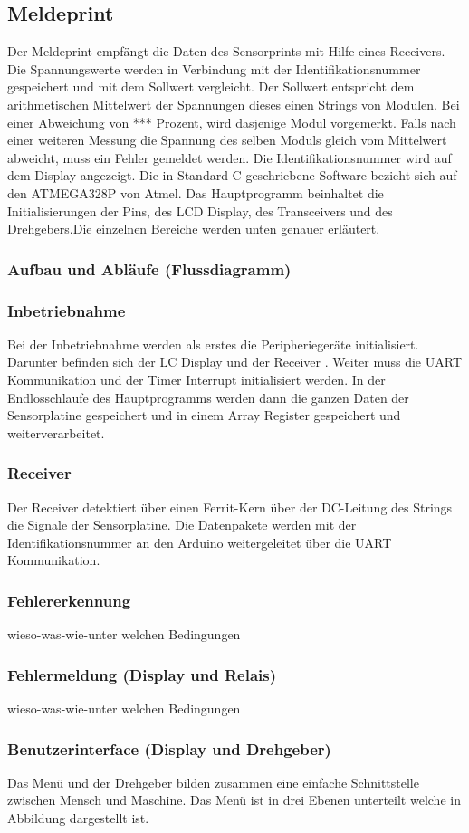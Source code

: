 \subsection{Meldeprint}
Der Meldeprint empfängt die Daten des Sensorprints mit Hilfe eines Receivers. Die Spannungswerte werden in Verbindung mit der Identifikationsnummer gespeichert und mit dem Sollwert vergleicht. Der Sollwert entspricht dem arithmetischen Mittelwert der Spannungen dieses einen Strings von Modulen. Bei einer Abweichung von *** Prozent, wird dasjenige Modul vorgemerkt. Falls nach einer weiteren Messung die Spannung des selben Moduls gleich vom Mittelwert abweicht, muss ein Fehler gemeldet werden. Die Identifikationsnummer wird auf dem Display angezeigt. Die in Standard C geschriebene Software bezieht sich auf den ATMEGA328P von Atmel. Das Hauptprogramm beinhaltet die Initialisierungen der Pins, des LCD Display, des Transceivers und des Drehgebers.Die einzelnen Bereiche werden unten genauer erläutert.
\subsubsection{Aufbau und Abläufe (Flussdiagramm)}
\subsubsection{Inbetriebnahme}
Bei der Inbetriebnahme werden als erstes die Peripheriegeräte initialisiert. Darunter befinden sich der LC Display und der Receiver . Weiter muss die UART Kommunikation und der Timer Interrupt initialisiert werden. In der Endlosschlaufe des Hauptprogramms werden dann die ganzen Daten der Sensorplatine gespeichert und in einem Array Register gespeichert und weiterverarbeitet.
\subsubsection{Receiver}
Der Receiver detektiert über einen Ferrit-Kern über der DC-Leitung des Strings die Signale der Sensorplatine. Die Datenpakete werden mit der Identifikationsnummer an den Arduino weitergeleitet über die UART Kommunikation.
\subsubsection{Fehlererkennung}
wieso-was-wie-unter welchen Bedingungen
\subsubsection{Fehlermeldung (Display und Relais)}
wieso-was-wie-unter welchen Bedingungen
\subsubsection{Benutzerinterface (Display und Drehgeber)}
Das Menü und der Drehgeber bilden zusammen eine einfache Schnittstelle zwischen Mensch und Maschine. Das Menü ist in drei Ebenen unterteilt welche in Abbildung  dargestellt ist.